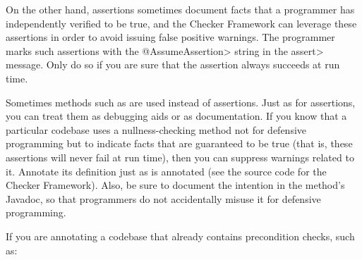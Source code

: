 On the other hand, assertions sometimes document facts that a programmer
has independently verified to be true, and the Checker Framework can
leverage these assertions in order to avoid issuing false positive
warnings.  The programmer marks such assertions with the \<@AssumeAssertion>
string in the \<assert> message.  Only do so if you are sure
that the assertion always succeeds at run time.


%
%
%
%


Sometimes methods such as
 are used
instead of assertions.  Just as for assertions, you can treat them as
debugging aids or as documentation.
If you know that a particular codebase uses
a nullness-checking method not for defensive programming but to indicate
facts that are guaranteed to be true (that is, these assertions will never
fail at run time), then you can suppress
warnings related to it.
Annotate its definition just as
 is annotated (see the
source code for the Checker Framework).
Also, be sure to document the intention in the method's Javadoc, so that
programmers do not
accidentally misuse it for defensive programming.


If you are annotating a codebase that already contains precondition checks,
such as:

